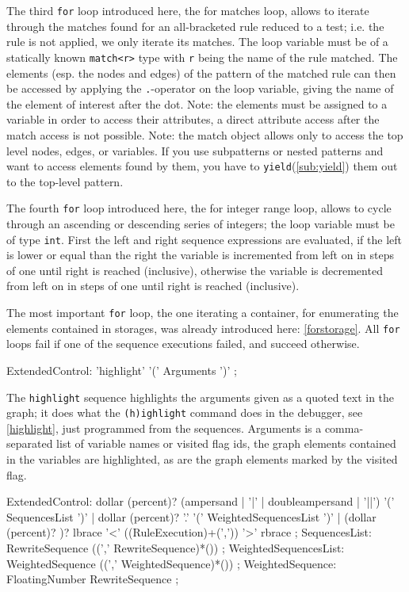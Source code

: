 The third \texttt{for} loop introduced here, the for matches loop, allows to iterate through the matches found for an all-bracketed rule reduced to a test; i.e. the rule is not applied, we only iterate its matches.
The loop variable must be of a statically known \texttt{match<r>} type with \texttt{r} being the name of the rule matched.
The elements (esp. the nodes and edges) of the pattern of the matched rule can then be accessed by applying the \texttt{.}-operator on the loop variable, giving the name of the element of interest after the dot.
Note: the elements must be assigned to a variable in order to access their attributes, a direct attribute access after the match access is not possible.
Note: the match object allows only to access the top level nodes, edges, or variables.
If you use subpatterns or nested patterns and want to access elements found by them, you have to \texttt{yield}(\ref{sub:yield}) them out to the top-level pattern.

The fourth \texttt{for} loop introduced here, the for integer range loop, allows to cycle through an ascending or descending series of integers; the loop variable must be of type \texttt{int}.
First the left and right sequence expressions are evaluated,
if the left is lower or equal than the right the variable is incremented from left on in steps of one until right is reached (inclusive),
otherwise the variable is decremented from left on in steps of one until right is reached (inclusive).

The most important \texttt{for} loop, the one iterating a container, for enumerating the elements contained in storages, was already introduced here: \ref{forstorage}.
All \texttt{for} loops fail if one of the sequence executions failed, and succeed otherwise.

\begin{rail}
  ExtendedControl:
		'highlight' '(' Arguments ')'
    ;
\end{rail}
The \texttt{highlight} sequence highlights the arguments given as a quoted text in the graph;
it does what the \texttt{(h)ighlight} command does in the debugger, see \ref{highlight}, just programmed from the sequences. 
Arguments is a comma-separated list of variable names or visited flag ids, the graph elements contained in the variables are highlighted, as are the graph elements marked by the visited flag.

\begin{rail} 
  ExtendedControl: 
	dollar (percent)? (ampersand | '|' | doubleampersand | '||') '(' SequencesList ')' |
	dollar (percent)? '.' '(' WeightedSequencesList ')' |
	(dollar (percent)? )? lbrace '<' ((RuleExecution)+(',')) '>' rbrace
	;
  SequencesList:
	RewriteSequence ((',' RewriteSequence)*())
	;
  WeightedSequencesList:
	WeightedSequence ((',' WeightedSequence)*())
	;
  WeightedSequence:
	FloatingNumber RewriteSequence
	;
\end{rail}

